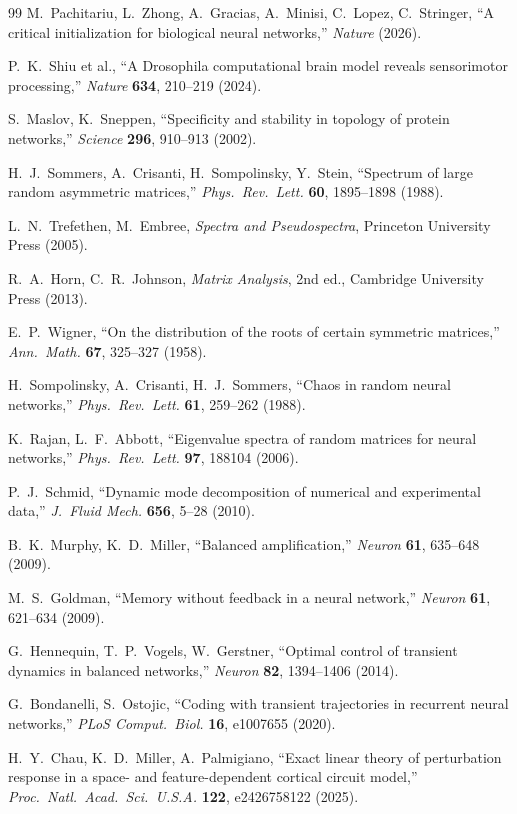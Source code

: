 \documentclass[11pt]{article}
\begin{document}
\begin{thebibliography}{99}
M.~Pachitariu, L.~Zhong, A.~Gracias, A.~Minisi, C.~Lopez, C.~Stringer,
``A critical initialization for biological neural networks,''
\emph{Nature} (2026).

P.~K.~Shiu et al.,
``A Drosophila computational brain model reveals sensorimotor processing,''
\emph{Nature} \textbf{634}, 210--219 (2024).

S.~Maslov, K.~Sneppen,
``Specificity and stability in topology of protein networks,''
\emph{Science} \textbf{296}, 910--913 (2002).

H.~J.~Sommers, A.~Crisanti, H.~Sompolinsky, Y.~Stein,
``Spectrum of large random asymmetric matrices,''
\emph{Phys.\ Rev.\ Lett.} \textbf{60}, 1895--1898 (1988).

L.~N.~Trefethen, M.~Embree,
\emph{Spectra and Pseudospectra},
Princeton University Press (2005).

R.~A.~Horn, C.~R.~Johnson,
\emph{Matrix Analysis}, 2nd ed.,
Cambridge University Press (2013).

E.~P.~Wigner,
``On the distribution of the roots of certain symmetric matrices,''
\emph{Ann.\ Math.} \textbf{67}, 325--327 (1958).

H.~Sompolinsky, A.~Crisanti, H.~J.~Sommers,
``Chaos in random neural networks,''
\emph{Phys.\ Rev.\ Lett.} \textbf{61}, 259--262 (1988).

K.~Rajan, L.~F.~Abbott,
``Eigenvalue spectra of random matrices for neural networks,''
\emph{Phys.\ Rev.\ Lett.} \textbf{97}, 188104 (2006).

P.~J.~Schmid,
``Dynamic mode decomposition of numerical and experimental data,''
\emph{J.\ Fluid Mech.} \textbf{656}, 5--28 (2010).

B.~K.~Murphy, K.~D.~Miller,
``Balanced amplification,''
\emph{Neuron} \textbf{61}, 635--648 (2009).

M.~S.~Goldman,
``Memory without feedback in a neural network,''
\emph{Neuron} \textbf{61}, 621--634 (2009).

G.~Hennequin, T.~P.~Vogels, W.~Gerstner,
``Optimal control of transient dynamics in balanced networks,''
\emph{Neuron} \textbf{82}, 1394--1406 (2014).

G.~Bondanelli, S.~Ostojic,
``Coding with transient trajectories in recurrent neural networks,''
\emph{PLoS Comput.\ Biol.} \textbf{16}, e1007655 (2020).

H.~Y.~Chau, K.~D.~Miller, A.~Palmigiano,
``Exact linear theory of perturbation response in a space- and feature-dependent
cortical circuit model,''
\emph{Proc.\ Natl.\ Acad.\ Sci.\ U.S.A.} \textbf{122}, e2426758122 (2025).
\end{thebibliography}
\end{document}
